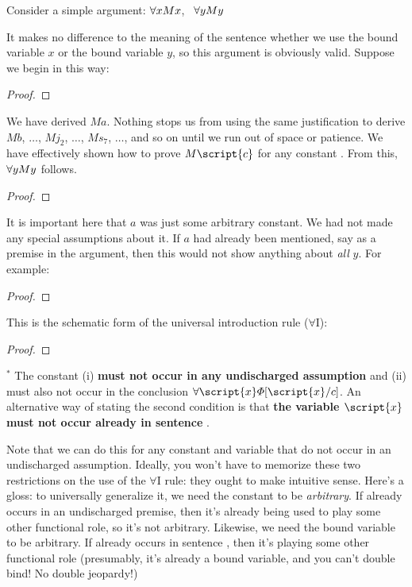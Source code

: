 Consider a simple argument: $\forall x Mx$, \therefore\ $\forall y My$

It makes no difference to the meaning of the sentence whether we use the bound variable $x$ or the bound variable $y$, so this argument is obviously valid. Suppose we begin in this way:

\begin{proof}
	 
	 
\end{proof}

We have derived $Ma$. Nothing stops us from using the same justification to derive $Mb$, $\ldots$, $Mj_2$, $\ldots$, $Ms_7$, $\ldots$, and so on until we run out of space or patience. We have effectively shown how to prove $M\script{c}$ for any constant . From this, $\forall y My$ follows.

\begin{proof}
	 
	 
	 
\end{proof}

It is important here that $a$ was just some arbitrary constant. We had not made any special assumptions about it. If $a$ had already been mentioned, say as a premise in the argument, then this would not show anything about \emph{all} $y$. For example:

\begin{proof}
	 \pr{}
	 
	 
\end{proof}


This is the schematic form of the universal introduction rule ($\forall$I):

\begin{proof}
	 
\end{proof}
$^\ast$ The constant  (i) \textbf{must not occur in any undischarged assumption} and {\color{black}(ii) must also not occur in the conclusion $\qt{\forall}{\script{x}}\metaA{}\substitute{c}{\script{x}}$. An alternative way of stating the second condition is that \textbf{the variable $\script{x}$ must not occur already in sentence \metaA{}}.} 

Note that we can do this for any constant and variable that do not occur in an undischarged assumption. {\color{black}Ideally, you won't have to memorize these two restrictions on the use of the $\forall$I rule: they ought to make intuitive sense. Here's a gloss: to universally generalize it, we need the constant  to be \textit{arbitrary}. If  already occurs in an undischarged premise, then it's already being used to play some other functional role, so it's not arbitrary. Likewise, we need the bound variable  to be arbitrary. If  already occurs in sentence \metaA{}, then it's playing some other functional role (presumably, it's already a bound variable, and you can't double bind! No double jeopardy!)}


